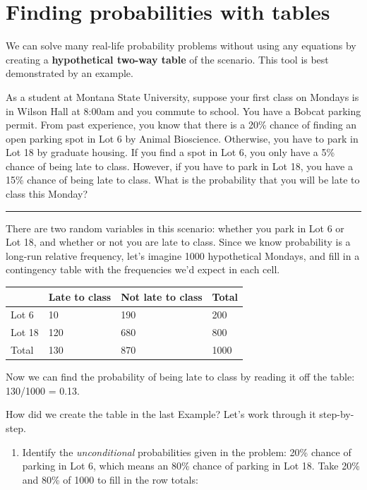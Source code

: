 \documentclass[
  10pt,
  openany]{book}
\providecommand{\tightlist}{%
  \setlength{\itemsep}{0pt}\setlength{\parskip}{0pt}}
\theoremstyle{definition}
\theoremstyle{definition}
\theoremstyle{definition}
\theoremstyle{definition}
\theoremstyle{remark}
\begin{document}
\section{Finding probabilities with tables}\label{finding-probabilities-with-tables}

We can solve many real-life probability problems without using any equations by creating a \textbf{hypothetical two-way table} of the scenario. This tool is best demonstrated by an example.

As a student at Montana State University, suppose your first class on Mondays is in Wilson Hall at 8:00am and you commute to school. You have a Bobcat parking permit. From past experience, you know that there is a 20\% chance of finding an open parking spot in Lot 6 by Animal Bioscience. Otherwise, you have to park in Lot 18 by graduate housing. If you find a spot in Lot 6, you only have a 5\% chance of being late to class. However, if you have to park in Lot 18, you have a 15\% chance of being late to class. What is the probability that you will be late to class this Monday?

\begin{center}\rule{0.5\linewidth}{0.5pt}\end{center}

There are two random variables in this scenario: whether you park in Lot 6 or Lot 18, and whether or not you are late to class. Since we know probability is a long-run relative frequency, let's imagine 1000 hypothetical Mondays, and fill in a contingency table with the frequencies we'd expect in each cell.

{\def\LTcaptype{none} %
\begin{longtable}[]{@{}llll@{}}
\toprule\noalign{}
& Late to class & Not late to class & Total \\
\midrule\noalign{}
\endhead
\bottomrule\noalign{}
\endlastfoot
Lot 6 & 10 & 190 & 200 \\
Lot 18 & 120 & 680 & 800 \\
Total & 130 & 870 & 1000 \\
\end{longtable}
}

Now we can find the probability of being late to class by reading it off the table: 130/1000 = 0.13.

How did we create the table in the last Example? Let's work through it step-by-step.

\begin{enumerate}
\def\labelenumi{\arabic{enumi}.}
\tightlist
\item
  Identify the \emph{unconditional} probabilities given in the problem: 20\% chance of parking in Lot 6, which means an 80\% chance of parking in Lot 18. Take 20\% and 80\% of 1000 to fill in the row totals:
\end{enumerate}
\end{document}
